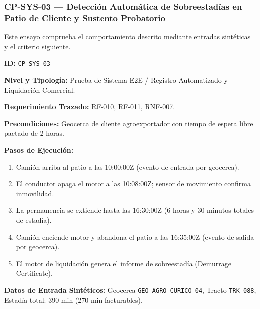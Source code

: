 \subsubsection*{CP-SYS-03 — Detección Automática de Sobreestadías en Patio de Cliente y Sustento Probatorio}\label{sec:9-cp-sys-03}
Este ensayo comprueba el comportamiento descrito mediante entradas sintéticas y el criterio siguiente.

\par\noindent\textbf{ID:} \texttt{C\allowbreak{}P\allowbreak{}-\allowbreak{}S\allowbreak{}Y\allowbreak{}S\allowbreak{}-\allowbreak{}0\allowbreak{}3\allowbreak{}}\par
\par\noindent\textbf{Nivel y Tipología:} Prueba de Sistema E2E / Registro Automatizado y Liquidación Comercial.\par
\par\noindent\textbf{Requerimiento Trazado:} RF-010, RF-011, RNF-007.\par
\par\noindent\textbf{Precondiciones:} Geocerca de cliente agroexportador con tiempo de espera libre pactado de 2 horas.\par
\par\noindent\textbf{Pasos de Ejecución:} \par
\begin{enumerate}
\item Camión arriba al patio a las 10:00:00Z (evento de entrada por geocerca).
\item El conductor apaga el motor a las 10:08:00Z; sensor de movimiento confirma inmovilidad.
\item La permanencia se extiende hasta las 16:30:00Z (6 horas y 30 minutos totales de estadía).
\item Camión enciende motor y abandona el patio a las 16:35:00Z (evento de salida por geocerca).
\item El motor de liquidación genera el informe de sobreestadía (Demurrage Certificate).
\end{enumerate}
\par\noindent\textbf{Datos de Entrada Sintéticos:} Geocerca \texttt{G\allowbreak{}E\allowbreak{}O\allowbreak{}-\allowbreak{}A\allowbreak{}G\allowbreak{}R\allowbreak{}O\allowbreak{}-\allowbreak{}C\allowbreak{}U\allowbreak{}R\allowbreak{}I\allowbreak{}C\allowbreak{}O\allowbreak{}-\allowbreak{}0\allowbreak{}4\allowbreak{}}, Tracto \texttt{T\allowbreak{}R\allowbreak{}K\allowbreak{}-\allowbreak{}0\allowbreak{}8\allowbreak{}8\allowbreak{}}, Estadía total: 390 min (270 min facturables).\par

